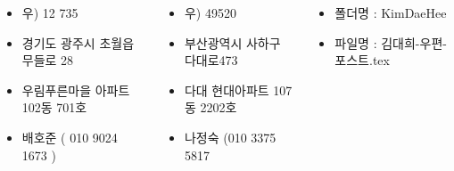 \documentclass[	20pt, 
							a1paper, 
							portrait, %
							margin=0mm, %
							innermargin=10mm,  		%
							blockverticalspace=4mm, %
							colspace=5mm, 
							subcolspace=0mm
							]{tikzposter}
\begin{document}
\begin{columns}

			{
				\begin{LARGE}
					\begin{itemize}
					\item 우)  12 735
					\item 경기도 광주시 초월읍 무들로 28
					\item 우림푸른마을 아파트 102동 701호
					\item 배호준 ( 010 9024 1673 )
					\end{itemize}
				\end{LARGE}
			}

			{
				\begin{LARGE}
					\begin{itemize}
					\item 우) 49520
					\item 부산광역시 사하구 다대로473
					\item 다대 현대아파트 107동 2202호
					\item 나정숙 (010 3375 5817
					\end{itemize}
				\end{LARGE}
			}


			{
				\begin{LARGE}
					\begin{itemize}
					\item 폴더명 : KimDaeHee
					\item 파일명 : 김대희-우편-포스트.tex
					\end{itemize}
				\end{LARGE}
			}




	\end{columns}
\end{document}
